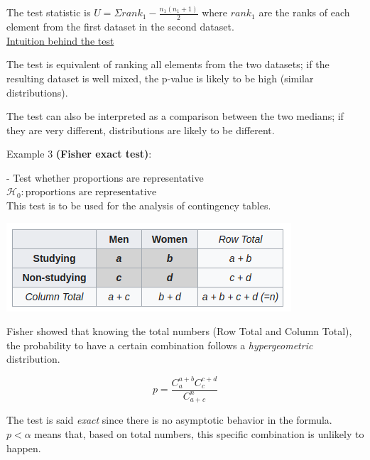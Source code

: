 \vspace{5mm}

The test statistic is $U = \Sigma rank_1 - \frac{n_1(n_1+1)}{2}$ where $rank_1$ are the ranks of each element from the first dataset in the second dataset. \\

\underline{Intuition behind the test}

The test is equivalent of ranking all elements from the two datasets; if the resulting dataset is well mixed, the p-value is likely to be high (similar distributions).

The test can also be interpreted as a comparison between the two medians; if they are very different, distributions are likely to be different.

\vspace{5mm}

Example 3 \textbf{(Fisher exact test)}: 

\vspace{5mm}

- Test whether proportions are representative \\

$\mathcal{H}_0: \text{proportions are representative} $ \\

This test is to be used for the analysis of contingency tables.

\begin{center}
\includegraphics[scale=0.6]{fisher_contingency_table.png}
\end{center}

Fisher showed that knowing the total numbers (Row Total and Column Total), the probability to have a certain combination follows a \textit{hypergeometric} distribution.

$$p = \frac{C_a^{a+b} C_c^{c+d}}{C_{a+c}^n}$$

The test is said \textit{exact} since there is no asymptotic behavior in the formula. \\

$p < \alpha$ means that, based on total numbers, this specific combination is unlikely to happen.

